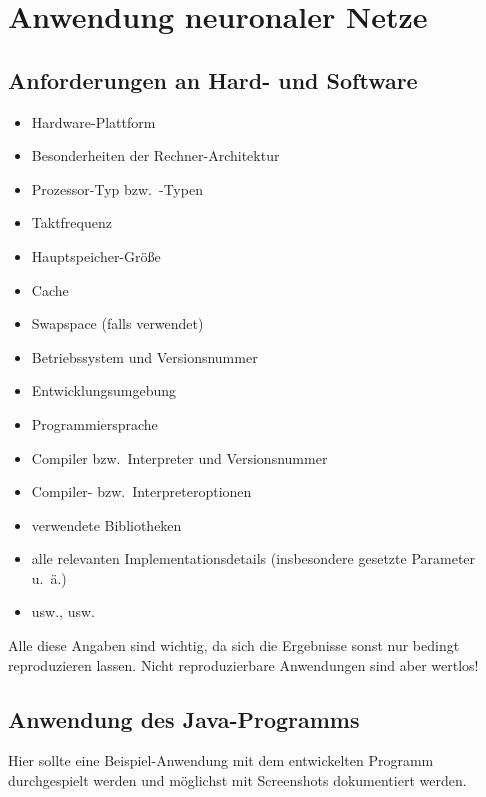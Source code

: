 \chapter{Anwendung neuronaler Netze}
\label{chap:anwendung}

\section{Anforderungen an Hard- und Software}
\begin{itemize}
\itemsep -6pt
\item Hardware-Plattform
\item Besonderheiten der Rechner-Architektur
\item Prozessor-Typ bzw.\ -Typen 
\item Taktfrequenz 
\item Hauptspeicher-Größe 
\item Cache 
\item Swapspace (falls verwendet)
\item Betriebssystem und Versionsnummer 
\item Entwicklungsumgebung 
\item Programmiersprache 
\item Compiler bzw.\ Interpreter und Versionsnummer 
\item Compiler- bzw.\ Interpreteroptionen 
\item verwendete Bibliotheken
\item alle relevanten Implementationsdetails 
      (insbesondere gesetzte Parameter u.~ä.)
\item usw., usw.
\end{itemize}
Alle diese Angaben sind wichtig, da sich die Ergebnisse sonst nur bedingt
reproduzieren lassen. Nicht reproduzierbare Anwendungen sind aber wertlos!

\section{Anwendung des Java-Programms}

Hier sollte eine Beispiel-Anwendung mit dem entwickelten Programm
durchgespielt werden und möglichst mit Screenshots dokumentiert werden.
